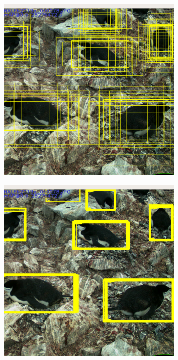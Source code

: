 \begin{figure}[htb]
  \centering
  \begin{subfigure}[t]{0.30\textwidth}
  \includegraphics[width=0.95\linewidth]{figures/object/anchors.png}
  \caption{}
  \end{subfigure}%
  \begin{subfigure}[t]{0.30\textwidth}
  \includegraphics[width=0.95\linewidth]{figures/object/predictions.png}

\end{subfigure}
\end{figure}
